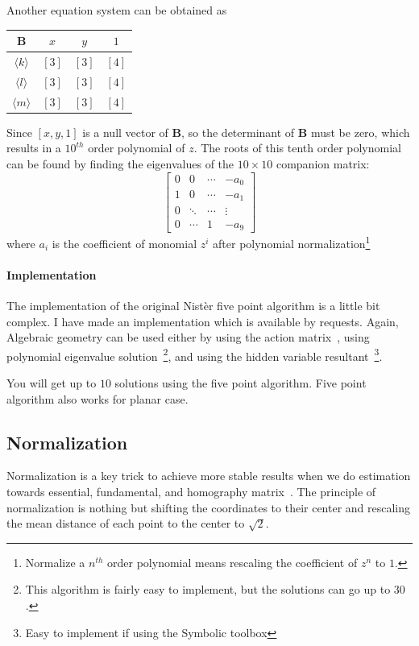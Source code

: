 \documentclass[a4paper]{report}
\begin{document}
Another equation system can be obtained as
\begin{center}
	\begin{tabular}{ |c|ccc|} 
		\hline
		$\mathbf{B}$ & $x$ & $y$ & $1$ \\ \hline
		 $\langle k \rangle$  & $[3]$ & $[3]$ & $[4]$ \\
		 $\langle l \rangle$  & $[3]$ & $[3]$ & $[4]$ \\
 		 $\langle m \rangle$  & $[3]$ & $[3]$ & $[4]$ \\
		\hline
	\end{tabular}
\end{center}
Since $[x,y,1]$ is a null vector of $\mathbf{B}$, so the determinant of $\mathbf{B}$ must be zero, which results in a $10^{th}$ order polynomial of $z$. The roots of this tenth order polynomial can be found by finding the eigenvalues of the $10 \times 10$ companion matrix:
$$
\left[
\begin{matrix}
0 & 0 & \cdots & -a_0 \\
1 &  0 & \cdots & -a_1 \\
0 & \ddots & \cdots & \vdots \\
0 & \cdots & 1 & -a_9
\end{matrix}
\right]
$$
where $a_i$ is the coefficient of monomial $z^{i}$ after polynomial normalization\footnote{Normalize a $n^{th}$ order polynomial means rescaling the coefficient of $z^{n}$ to $1$.}
\paragraph{Implementation}
The implementation of the original Nist\`er five point algorithm is a little bit complex. I have made an implementation which is available by requests.  Again, Algebraic geometry can be used either by using the action matrix~\cite{stewenius2006recent}, using polynomial eigenvalue solution~\cite{kukelova2008polynomial}\footnote{This algorithm is fairly easy to implement, but the solutions can go up to $30$.}, and using the hidden variable resultant~\cite{li2006five}\footnote{Easy to implement if using the Symbolic toolbox}.

You will get up to $10$ solutions using the five point algorithm. Five point algorithm also works for planar case. 

\subsection{Normalization}
Normalization is a key trick to achieve more stable results when we do estimation towards essential, fundamental, and homography matrix~\cite{hartley1995defence}. The principle of normalization is nothing but shifting the coordinates to their center and rescaling the mean distance of each point to the center to $\sqrt{2}$.
\end{document}
